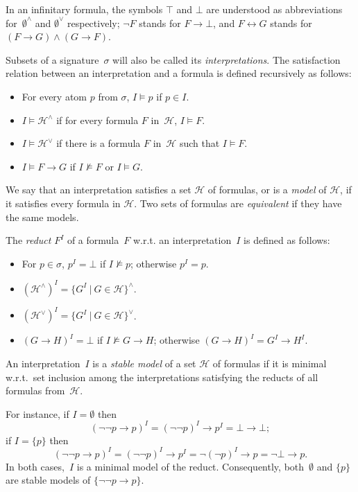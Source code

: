 \documentclass{tlp}
\def\rar{\rightarrow}
\def\lrar{\leftrightarrow}
\begin{document}
In an infinitary formula, the symbols $\top$ and $\bot$
are understood as abbreviations
for~$\emptyset^{\land}$ and $\emptyset^{\lor}$ respectively;
$\neg F$ stands for $F\rar\bot$, and $F\lrar G$
stands for \hbox{$(F\rar G)\land(G\rar F)$}.

Subsets of a signature~$\sigma$ will also be called its {\sl interpretations}.
The satisfaction relation between an interpretation and a formula is
defined recursively as follows:
\begin{itemize}
\item For every atom $p$ from $\sigma$, $I\models p$ if $p\in I$.
\item $I\models\mathcal{H}^\land$ if for every formula $F$ in~$\mathcal{H}$,
$I\models F$.
\item $I\models\mathcal{H}^\lor$ if there is a formula $F$ in~$\mathcal{H}$
such that $I\models F$.
\item $I\models F\rar G$ if $I\not\models F$ or $I\models G$.
\end{itemize}
We say that an interpretation satisfies a set $\mathcal{H}$ of formulas,
or is a {\sl model} of $\mathcal{H}$, if it satisfies every formula in
$\mathcal{H}$.  Two sets of formulas are {\sl equivalent} if
they have the same models.

The {\sl reduct} $F^I$ of a formula~$F$ w.r.t. an
interpretation~$I$ is defined as follows:
\begin{itemize}
\item For $p\in \sigma$, $p^I=\bot$ if $I\not\models p$; otherwise $p^I=p$.
\item $(\mathcal{H}^\land)^I=\{G^I\ |\ G\in\mathcal{H}\}^\land$.
\item $(\mathcal{H}^\lor)^I=\{G^I\ |\ G\in\mathcal{H}\}^\lor$.
\item $(G\rar H)^I=\bot$ if $I\not\models G\rar H$; otherwise
\hbox{$(G\rar H)^I=G^I\rar H^I$}.
\end{itemize}
An interpretation~$I$ is a {\sl stable model} of a set $\mathcal{H}$ of
formulas if it is minimal w.r.t.\ set inclusion among the interpretations
satisfying the reducts of all formulas from~$\mathcal{H}$.

For instance, if $I=\emptyset$ then
$$(\neg \neg p \rar p)^I=(\neg \neg p)^I\rar p^I=\bot\rar\bot;$$
if $I=\{p\}$ then
$$(\neg \neg p \rar p)^I=(\neg \neg p)^I\rar p^I=\neg (\neg p)^I\rar p
   =\neg\bot\rar p.$$
In both cases,~$I$ is a minimal model of the reduct.  Consequently,
both~$\emptyset$ and $\{p\}$ are stable models of $\{\neg\neg p\rar p\}$.
\end{document}
